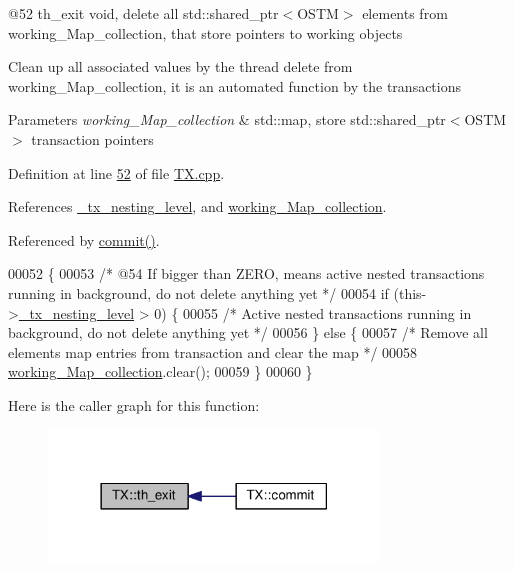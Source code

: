 @52 th\+\_\+exit void, delete all std\+::shared\+\_\+ptr$<$\+O\+S\+T\+M$>$ elements from working\+\_\+\+Map\+\_\+collection, that store pointers to working objects 

Clean up all associated values by the thread delete from working\+\_\+\+Map\+\_\+collection, it is an automated function by the transactions


\begin{DoxyParams}{Parameters}
{\em working\+\_\+\+Map\+\_\+collection} & std\+::map, store std\+::shared\+\_\+ptr$<$\+O\+S\+T\+M$>$ transaction pointers \\
\hline
\end{DoxyParams}


Definition at line \hyperlink{_t_x_8cpp_source_l00052}{52} of file \hyperlink{_t_x_8cpp_source}{T\+X.\+cpp}.



References \hyperlink{_t_x_8h_source_l00101}{\+\_\+tx\+\_\+nesting\+\_\+level}, and \hyperlink{_t_x_8h_source_l00093}{working\+\_\+\+Map\+\_\+collection}.



Referenced by \hyperlink{_t_x_8cpp_source_l00177}{commit()}.


\begin{DoxyCode}
00052                  \{
00053     \textcolor{comment}{/* @54 If bigger than ZERO, means active nested transactions running in background, do not delete
       anything yet */}
00054     \textcolor{keywordflow}{if} (this->\hyperlink{class_t_x_ae8f413fd7f4fea322e7ad3c668f9898e_ae8f413fd7f4fea322e7ad3c668f9898e}{\_tx\_nesting\_level} > 0) \{
00055         \textcolor{comment}{/* Active nested transactions running in background, do not delete anything yet */}
00056     \} \textcolor{keywordflow}{else} \{
00057         \textcolor{comment}{/* Remove all elements map entries from transaction and clear the map */}
00058         \hyperlink{class_t_x_a81aafda16e2f20e36ec6c68e584668ff_a81aafda16e2f20e36ec6c68e584668ff}{working\_Map\_collection}.clear();
00059     \}
00060 \}
\end{DoxyCode}


Here is the caller graph for this function\+:\nopagebreak
\begin{figure}[H]
\begin{center}
\leavevmode
\includegraphics[width=249pt]{class_t_x_ae045534c4a9d39bd5c6ea2a39a372a79_ae045534c4a9d39bd5c6ea2a39a372a79_icgraph}
\end{center}
\end{figure}




